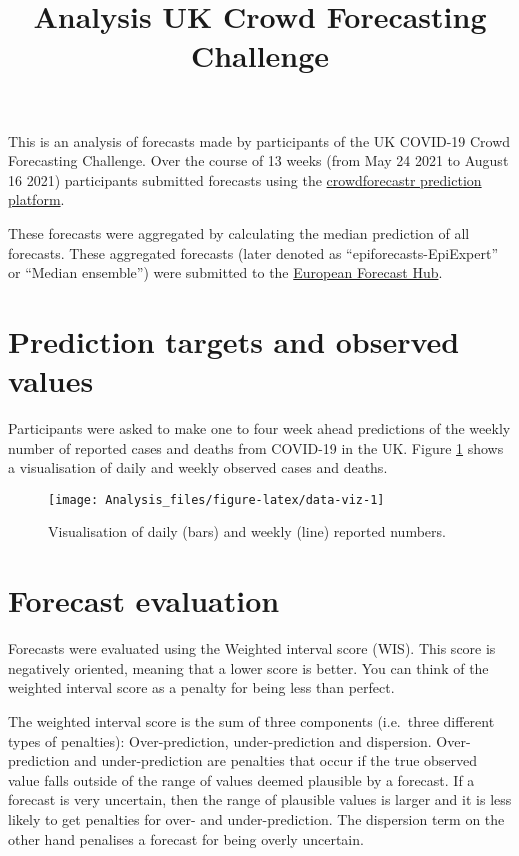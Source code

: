 \documentclass[
]{article}
\title{Analysis UK Crowd Forecasting Challenge}
\author{}
\date{\vspace{-2.5em}}
\begin{document}
\maketitle

{
\setcounter{tocdepth}{2}
\tableofcontents
}
This is an analysis of forecasts made by participants of the UK COVID-19 Crowd Forecasting Challenge. Over the course of 13 weeks (from May 24 2021 to August 16 2021) participants submitted forecasts using the \href{https://crowdforecastr.org}{crowdforecastr prediction platform}.

These forecasts were aggregated by calculating the median prediction of all forecasts. These aggregated forecasts (later denoted as ``epiforecasts-EpiExpert'' or ``Median ensemble'') were submitted to the \href{https://covid19forecasthub.eu/}{European Forecast Hub}.

\hypertarget{prediction-targets-and-observed-values}{%
\section{Prediction targets and observed values}\label{prediction-targets-and-observed-values}}

Participants were asked to make one to four week ahead predictions of the weekly number of reported cases and deaths from COVID-19 in the UK. Figure \ref{fig:data-viz} shows a visualisation of daily and weekly observed cases and deaths.

\begin{figure}
\texttt{[image: Analysis\_files/figure-latex/data-viz-1]} \caption{Visualisation of daily (bars) and weekly (line) reported numbers.}\label{fig:data-viz}
\end{figure}

\hypertarget{forecast-evaluation}{%
\section{Forecast evaluation}\label{forecast-evaluation}}

Forecasts were evaluated using the Weighted interval score (WIS). This score is negatively oriented, meaning that a lower score is better. You can think of the weighted interval score as a penalty for being less than perfect.

The weighted interval score is the sum of three components (i.e.~three different types of penalties): Over-prediction, under-prediction and dispersion. Over-prediction and under-prediction are penalties that occur if the true observed value falls outside of the range of values deemed plausible by a forecast. If a forecast is very uncertain, then the range of plausible values is larger and it is less likely to get penalties for over- and under-prediction. The dispersion term on the other hand penalises a forecast for being overly uncertain.
\end{document}
